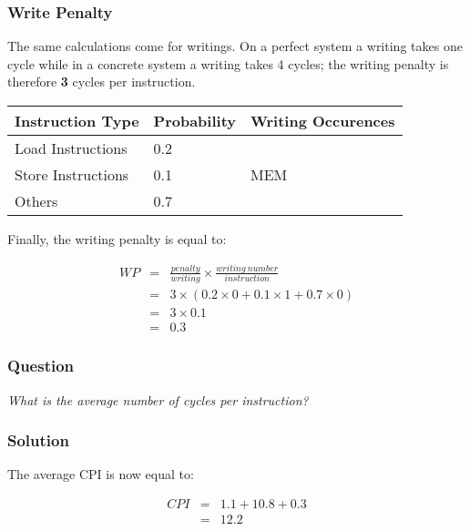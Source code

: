 
\begin{frame}
  \frametitle{Write Penalty}

  The same calculations come for writings. On a perfect system a writing
  takes one cycle while in a concrete system a writing takes 4 cycles; the
  writing penalty is therefore \textbf{3} cycles per instruction.

  \-

  \begin{tabular}{|p{3cm}|p{3cm}|p{3cm}|}
    \hline

    \textbf{Instruction Type} & \textbf{Probability} &
    \textbf{Writing Occurences} \\

    \hline

    Load Instructions & 0.2 & \\

    \hline

    Store Instructions & 0.1 & MEM \\

    \hline

    Others & 0.7 & \\

    \hline
  \end{tabular}

  \-

  Finally, the writing penalty is equal to:

  \begin{eqnarray*}
    WP & = & \frac{penalty}{writing} \times
             \frac{writing~number}{instruction} \\
       & = & 3 \times (0.2 \times 0 + 0.1 \times 1 + 0.7 \times 0) \\
       & = & 3 \times 0.1 \\
       & = & 0.3
  \end{eqnarray*}
\end{frame}


\begin{frame}
  \frametitle{Question}

  \textit{What is the average number of cycles per instruction?}
\end{frame}


\begin{frame}
  \frametitle{Solution}

  The average CPI is now equal to:

  \-

  \begin{eqnarray*}
    CPI & = & 1.1 + 10.8 + 0.3 \\
        & = & 12.2
  \end{eqnarray*}
\end{frame}


